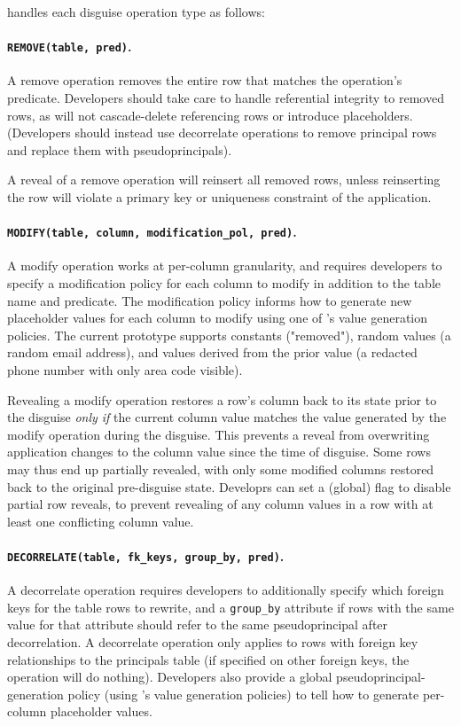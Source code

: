 \sys handles each disguise operation type as follows:
%

\paragraph{\texttt{REMOVE(table, pred)}.}
A remove operation removes the entire row that matches the operation's
predicate.
%
Developers should take care to handle referential integrity to removed rows, as
\sys will not cascade-delete referencing rows or introduce placeholders.
(Developers should instead use decorrelate operations to remove principal rows
and replace them with pseudoprincipals).
%

%
A reveal of a remove operation will reinsert all removed rows, unless
reinserting the row will violate a primary key or uniqueness constraint of the
application.
%

%
\paragraph{\texttt{MODIFY(table, column, modification\_pol, pred)}.}
A modify operation works at per-col\-umn granularity, and requires developers to
specify a modification policy for each column to modify in addition to the table
name and predicate.
%
The modification policy informs \sys how to generate new placeholder values for
each column to modify using one of \sys's value generation policies. The current
prototype supports constants (\eg "removed"), random values (\eg a random email
address), and values derived from the prior value (\eg a redacted phone number
with only area code visible).
%

%
Revealing a modify operation restores a row's column back to its state prior
to the disguise \emph{only if} the current column value matches the value
generated by the modify operation during the disguise. This prevents a reveal
from overwriting application changes to the column value since the time of
disguise.
%
Some rows may thus end up partially revealed, with only some modified columns
restored back to the original pre-disguise state.  Developrs can set a (global)
flag to disable partial row reveals, to prevent revealing of any column values
in a row with at least one conflicting column value.
%

%
\paragraph{\texttt{DECORRELATE(table, fk\_keys, group\_by, pred)}.}
%
A decorrelate operation requires developers to additionally specify which
foreign keys for the table rows to rewrite, and a \texttt{group\_by} attribute
if rows with the same value for that attribute should refer to the same
pseudoprincipal after decorrelation.
%
A decorrelate operation only applies to rows with foreign key relationships to
the principals table (if specified on other foreign keys, the operation will do
nothing).
%
Developers also provide a global pseudoprincipal-generation policy (using \sys's
value generation policies) to tell \sys how to generate per-column placeholder
values.
%

